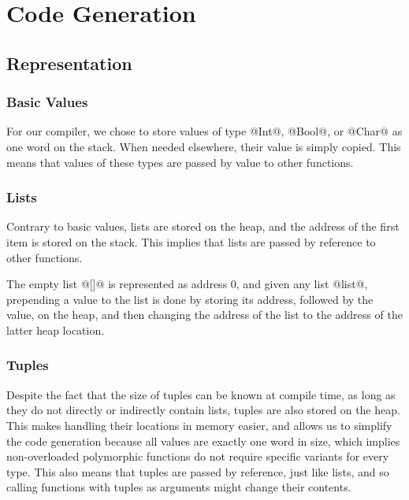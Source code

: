 \chapter{Code Generation}\label{chapter:generating}

\section{Representation}

\subsection{Basic Values}
For our compiler, we chose to store values of type @Int@, @Bool@, or @Char@ as one word on the stack. When needed elsewhere, their value is simply copied. This means that values of these types are passed by value to other functions.

\subsection{Lists}
Contrary to basic values, lists are stored on the heap, and the address of the first item is stored on the stack. This implies that lists are passed by reference to other functions.

The empty list @[]@ is represented as address 0, and given any list @list@, prepending a value to the list is done by storing its address, followed by the value, on the heap, and then changing the address of the list to the address of the latter heap location.

\subsection{Tuples}
Despite the fact that the size of tuples can be known at compile time, as long as they do not directly or indirectly contain lists, tuples are also stored on the heap. This makes handling their locations in memory easier, and allows us to simplify the code generation because all values are exactly one word in size, which implies non-overloaded polymorphic functions do not require specific variants for every type. This also means that tuples are passed by reference, just like lists, and so calling functions with tuples as arguments might change their contents.

